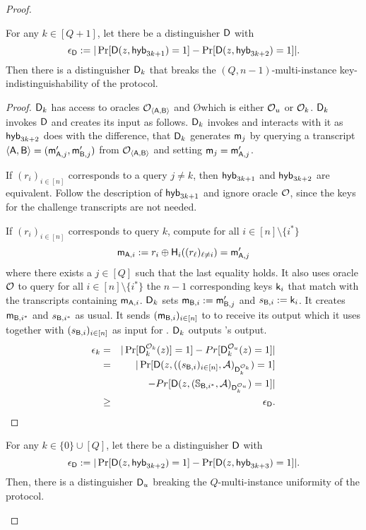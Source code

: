 \begin{proof}
\begin{claim}
For any $k\in[Q+1]$, let there be a distinguisher $\mathsf D$ with
$$
\epsilon_{\mathsf D}:=|\Pr[\mathsf D(z,\mathsf{hyb}_{3k+1})=1] -\Pr[\mathsf D(z,\mathsf{hyb}_{3k+2})=1]|.
$$
Then there is a distinguisher $\mathsf D_k$ that breaks the $(Q,n-1)$-multi-instance key-indistinguishability of the \UKA protocol.
\end{claim}

\begin{proof}
$\mathsf D_k$ has access to oracles $\mathcal{O}_{\langle \mathsf{A},\mathsf{B}\rangle}$ and \O which is either $\mathcal{O}_u$ or $\mathcal{O}_k$. $\mathsf D_k$ invokes $\mathsf D$ and creates its input as follows. $\mathsf D_k$ invokes \Adv and interacts with it as $\mathsf{hyb}_{3k+2}$ does with the difference, that $\mathsf D_k$ generates $\mathsf{m}_j$ by querying a transcript $\langle \mathsf{A}, \mathsf{B}\rangle=(\mathsf{m}_{\mathsf{A},j}',\mathsf{m}_{\mathsf{B},j}')$ from $\mathcal{O}_{\langle \mathsf{A},\mathsf{B}\rangle}$ and setting $\mathsf{m}_j=\mathsf{m}_{\mathsf{A},j}'$. 

If $(r_i)_{i\in[n]}$ corresponds to a query $j\neq k$, then $\mathsf{hyb}_{3k+1}$ and $\mathsf{hyb}_{3k+2}$ are equivalent. Follow the description of $\mathsf{hyb}_{3k+1}$ and ignore oracle $\mathcal{O}$, since the keys for the challenge transcripts are not needed.

If $(r_i)_{i\in[n]}$ corresponds to query $k$,
compute for all $i\in[n]\setminus\{i^*\}$
$$
\mathsf{m}_{\mathsf{A},i}:=r_i\oplus\mathsf{H}_i((r_{\ell})_{\ell\neq i})=\mathsf{m}_{\mathsf{A},j}'
$$
where there exists a $j\in[Q]$ such that the last equality holds. It also uses oracle $\mathcal{O}$ to query for all $i\in[n]\setminus\{i^*\}$ the $n-1$ corresponding keys $\mathsf{k}_i$ that match with the transcripts containing $\mathsf{m}_{\mathsf{A},i}$. $\mathsf D_k$ sets $\mathsf{m}_{\mathsf{B},i}:=\mathsf{m}_{\mathsf{B},j}'$ and $s_{\mathsf{B},i}:=\mathsf{k}_i$. It creates $\mathsf{m}_{\mathsf{B},i^*}$ and $s_{\mathsf{B},i^*}$ as usual. It sends $(\mathsf{m}_{\mathsf{B},i})_{i\in[n]}$ to \Adv to receive its output which it uses together with $(s_{\mathsf{B},i})_{i\in[n]}$ as input for \D. $\mathsf D_k$ outputs \D's output.  
\begin{eqnarray*}
\epsilon_{k}&=&|\Pr[\mathsf D_k^{\mathcal{O}_{k}}(z)]=1]-Pr[\mathsf D_k^{\mathcal{O}_{u}}(z)=1]|\\
&= &|\Pr[\mathsf D(z,((s_{\mathsf{B},i})_{i\in[n]},\mathcal{A})_{\mathsf D_k^{\mathcal{O}_{k}}})=1]\\
&&-Pr[\mathsf D(z,(\mathsf{\mathbb S}_{\mathsf{B},i^*},\mathcal{A})_{\mathsf D_k^{\mathcal{O}_{u}}})=1]|\\
&\geq&\epsilon_{\mathsf D}.
\end{eqnarray*}
\pe
\end{proof}

\begin{claim}\label{claim:first}
For any $k\in\{0\}\cup[Q]$, let there be a distinguisher $\mathsf D$ with
$$
\epsilon_{\mathsf D}:=|\Pr[\mathsf D(z,\mathsf{hyb}_{3k+2})=1] -\Pr[\mathsf D(z,\mathsf{hyb}_{3k+3})=1]|.
$$
Then, there is a distinguisher $\mathsf D_u$ breaking the $Q$-multi-instance uniformity of the \UKA protocol.
\end{claim}


\end{proof}
